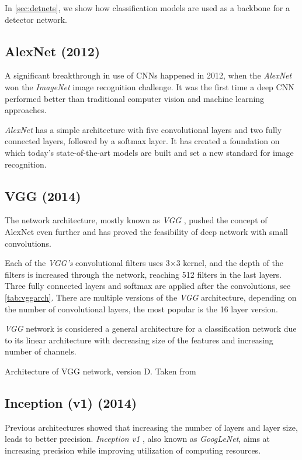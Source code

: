 In \cref{sec:detnets}, we show how classification models are used as a backbone for a detector network.

\subsection{AlexNet (2012)}
A significant breakthrough in use of CNNs happened in 2012, when the \textit{AlexNet} \cite{bib:alexnet} won the \textit{ImageNet} image recognition challenge. It was the first time a deep CNN performed better than traditional computer vision and machine learning approaches. 

\textit{AlexNet} has a simple architecture with five convolutional layers and two fully connected layers, followed by a softmax layer. It has created a foundation on which today's state-of-the-art models are built and set a new standard for image recognition.

\subsection{VGG (2014)}
\label{sec:VGG}
The network architecture, mostly known as \textit{VGG} \cite{bib:vgg}, pushed the concept of AlexNet even further and has proved the feasibility of deep network with small convolutions. 

Each of the \textit{VGG's} convolutional filters uses 3$\times$3 kernel, and the depth of the filters is increased through the network, reaching 512 filters in the last layers. Three fully connected layers and softmax are applied after the convolutions, see \cref{tab:vggarch}. There are multiple versions of the \textit{VGG} architecture, depending on the number of convolutional layers, the most popular is the 16 layer version. 

\textit{VGG} network is considered a general architecture for a classification network due to its linear architecture with decreasing size of the features and increasing number of channels. 

\begin{table}
    \centering
    \caption{Architecture of VGG network, version D. Taken from \cite[table 1]{bib:vgg}}
    \label{tab:vggarch}
\end{table}
    
\subsection{Inception (v1) (2014)}
\label{sec:inception}
Previous architectures showed that increasing the number of layers and layer size, leads to better precision. \textit{Inception v1} \cite{bib:googlenet}, also known as \textit{GoogLeNet}, aims at increasing precision while improving utilization of computing resources.

